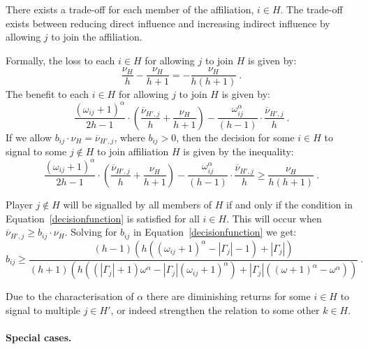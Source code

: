 \documentclass[11pt,fleqn]{article}
\begin{document}
There exists a trade-off for each member of the affiliation, $i \in H$. The trade-off exists between reducing direct influence and increasing indirect influence by allowing $j$ to join the affiliation.

Formally, the loss to each $i \in H$ for allowing $j$ to join $H$ is given by:
\begin{equation}
\frac{\nu_{H}}{h} - \frac{\nu_{H}}{h+1} = - \frac{\nu_{H}}{h(h + 1)} ~ .
\end{equation}
The benefit to each $i \in H$ for allowing $j$ to join $H$ is given by:
\begin{equation}
\frac{(\omega_{ij}+1)^{\alpha}}{2h-1} \cdot \left( \frac{\overline{\nu}_{H',j}}{h} + \frac{\nu_{H}}{h+1} \right) - \frac{\omega_{ij}^{\alpha}}{(h-1)} \cdot \frac{\overline{\nu}_{H',j}}{h} ~ .
\end{equation}
If we allow $b_{ij} \cdot \nu_{H} = \overline{\nu}_{H',j}$, where $b_{ij} > 0$, then the decision for some $i \in H$ to signal to some $j \notin H$ to join affiliation $H$ is given by the inequality:
\begin{equation} \label{decisionfunction}
\frac{(\omega_{ij}+1)^{\alpha}}{2h-1} \cdot \left( \frac{\overline{\nu}_{H',j}}{h} + \frac{\nu_{H}}{h+1} \right) - \frac{\omega_{ij}^{\alpha}}{(h-1)} \cdot \frac{\overline{\nu}_{H',j}}{h} \geqslant \frac{\nu_{H}}{h(h + 1)} ~ .
\end{equation}

Player $j \notin H$ will be signalled by all members of $H$ if and only if the condition in Equation~\ref{decisionfunction} is satisfied for all $i \in H$. This will occur when $\overline{\nu}_{H',j} \geqslant b_{ij} \cdot \nu_{H}$. Solving for $b_{ij}$ in Equation~\ref{decisionfunction} we get:
\begin{equation} \label{eq:b}
b_{ij} \geqslant \frac{(h-1)(h((\omega_{ij} + 1)^{\alpha} - |\Gamma_{j}| - 1) + |\Gamma_{j}|)}{(h+1)(h((|\Gamma_{j}| + 1)\omega^{\alpha} - |\Gamma_{j}| (\omega_{ij} + 1)^{\alpha}) + |\Gamma_{j}|((\omega+1)^{\alpha} - \omega^{\alpha}))} ~ .
\end{equation}

Due to the characterisation of $\alpha$ there are diminishing returns for some $i \in H$ to signal to multiple $j \in H'$, or indeed strengthen the relation to some other $k \in H$.

\paragraph{Special cases.}
\end{document}
